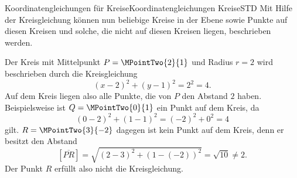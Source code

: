 \begin{MXContent}{Koordinatengleichungen für Kreise}{Koordinatengleichungen Kreise}{STD}
Mit Hilfe der Kreisgleichung können nun beliebige Kreise in der Ebene sowie Punkte auf diesen Kreisen und solche, die nicht auf diesen Kreisen liegen, beschrieben werden. 



\begin{MExample}
Der Kreis mit Mittelpunkt $P=\MPointTwo{2}{1}$ und Radius $r=2$ wird beschrieben durch die Kreisgleichung
\[
 (x-2)^2 + (y-1)^2 = 2^2 = 4.
\]
Auf dem Kreis liegen also alle Punkte, die von $P$ den Abstand $2$ haben. Beispielsweise ist $Q=\MPointTwo{0}{1}$ ein Punkt auf dem Kreis, da
\[
 (0-2)^2 + (1-1)^2 = (-2)^2 + 0^2 = 4
\]
gilt. $R=\MPointTwo{3}{-2}$ dagegen ist kein Punkt auf dem Kreis, denn er besitzt den Abstand
\[
 [\overline{P R}] = \sqrt{(2-3)^2 + (1-(-2))^2} = \sqrt{10} \neq 2.
\]
Der Punkt $R$ erfüllt also nicht die Kreisgleichung.

\begin{center}
%
\end{center}
\end{MExample}


\end{MXContent}
